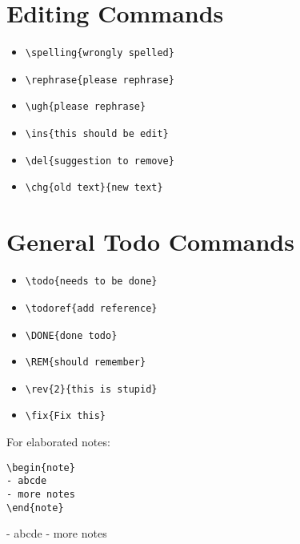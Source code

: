 \documentclass{article}
\begin{document}
\section{Editing Commands}

\begin{itemize}
  \item \verb|\spelling{wrongly spelled}| 

  \item \verb|\rephrase{please rephrase}| 

  \item \verb|\ugh{please rephrase}| 

  \item \verb|\ins{this should be edit}| 

  \item \verb|\del{suggestion to remove}| 

  \item \verb|\chg{old text}{new text}| 
\end{itemize}

\section{General Todo Commands}

\begin{itemize}
  \item \verb|\todo{needs to be done}|  
  \item \verb|\todoref{add reference}| 
  \item \verb|\DONE{done todo}| 
  \item \verb|\REM{should remember}| 
  \item \verb|\rev{2}{this is stupid}| 
  \item \verb|\fix{Fix this}| 
\end{itemize}

For elaborated notes:

\begin{verbatim}
\begin{note}
- abcde
- more notes
\end{note}
\end{verbatim}

\begin{note}
- abcde
- more notes
\end{note}
\end{document}
